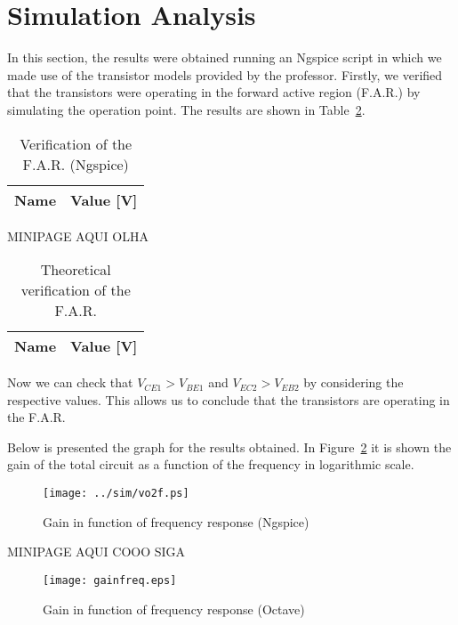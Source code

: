 \section{Simulation Analysis}
\label{sec:simulation}
In this section, the results were obtained running an Ngspice script in which we made use of the transistor models provided by the professor.
Firstly, we verified that the transistors were operating in the forward active region (F.A.R.) by simulating the operation point. The results are shown in Table~\ref{tab:opngspice}.

\begin{table}[H]
 \centering
 \begin{tabular}{|l|r|}
 \hline
 {\bf Name} & {\bf Value [V]} \\ \hline

 \end{tabular}
 \caption{Verification of the F.A.R. (Ngspice)}
 \label{tab:opngspice}
 \end{table}
 
 MINIPAGE AQUI OLHA
 
 \begin{table}[H]
 \centering
 \begin{tabular}{|l|r|}
 \hline
 {\bf Name} & {\bf Value [V]} \\ \hline

 \end{tabular}
 \caption{Theoretical verification of the F.A.R.}
 \label{tab:opngspice}
 \end{table}
 
  Now we can check that $V_{CE1}>V_{BE1}$ and $V_{EC2}>V_{EB2}$ by considering the respective values. This allows us to conclude that the transistors are operating in the F.A.R.


Below is presented the graph for the results obtained. In Figure~\ref{fig:sim1} it is shown the gain of the total circuit as a
function of the frequency in logarithmic scale.

\begin{figure}[H] \centering
\texttt{[image: ../sim/vo2f.ps]}
\caption{Gain in function of frequency response (Ngspice)}
\label{fig:sim1}
\end{figure}

MINIPAGE AQUI COOO SIGA

\begin{figure}[H] \centering
\texttt{[image: gainfreq.eps]}
\caption{Gain in function of frequency response (Octave)}
\label{fig:sim1}
\end{figure}

